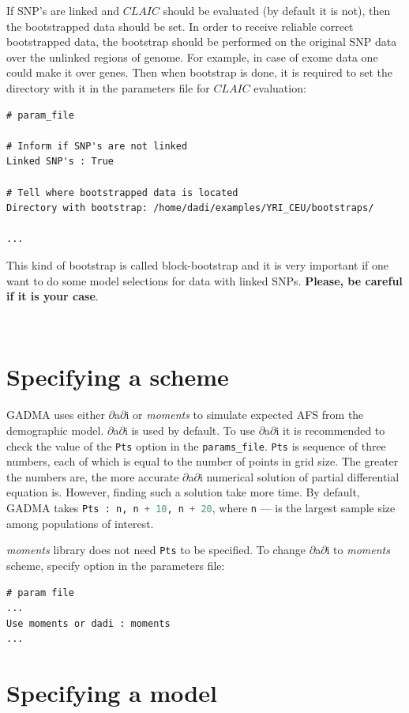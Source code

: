 \documentclass[12pt]{article}
\makeatletter
\newcommand{\dadi}{$\partial$a$\partial$i\xspace}
\newcommand{\moments}{\textit{moments}\xspace}
\newcommand{\py}[1]{\lstinline[language=Python, showstringspaces=False]@#1@}
\makeatother
\begin{document}
If SNP's are linked and $CLAIC$ should be evaluated (by default it is not), then the bootstrapped data should be set. In order to receive reliable correct bootstrapped data, the bootstrap should be performed on the original SNP data over the unlinked regions of genome. For example, in case of exome data one could make it over genes. Then when bootstrap is done, it is required to set the directory with it in the parameters file for $CLAIC$ evaluation:

\begin{lstlisting}
# param_file

# Inform if SNP's are not linked
Linked SNP's : True

# Tell where bootstrapped data is located
Directory with bootstrap: /home/dadi/examples/YRI_CEU/bootstraps/

...
\end{lstlisting}

This kind of bootstrap is called block-bootstrap and it is very important if one want to do some model selections for data with linked SNPs. \textbf{Please, be careful if it is your case}.

~\
\section{Specifying a scheme}

GADMA uses either \dadi or \moments to simulate expected AFS from the demographic model. \dadi is used by default. To use \dadi it is recommended to check the value of the \py{Pts} option in the \py{params_file}. \py{Pts} is sequence of three numbers, each of which is equal to the number of points in grid size. The greater the numbers are, the more accurate \dadi numerical solution of partial differential equation is. However, finding such a solution take more time. By default, GADMA takes \py{Pts : n, n + 10, n + 20}, where \py{n} — is the largest sample size among populations of interest. 

\moments library does not need \py{Pts} to be specified. To change \dadi to \moments scheme, specify option in the parameters file:

\begin{lstlisting}
# param file
...
Use moments or dadi : moments
...
\end{lstlisting}

\section{Specifying a model}
\end{document}
